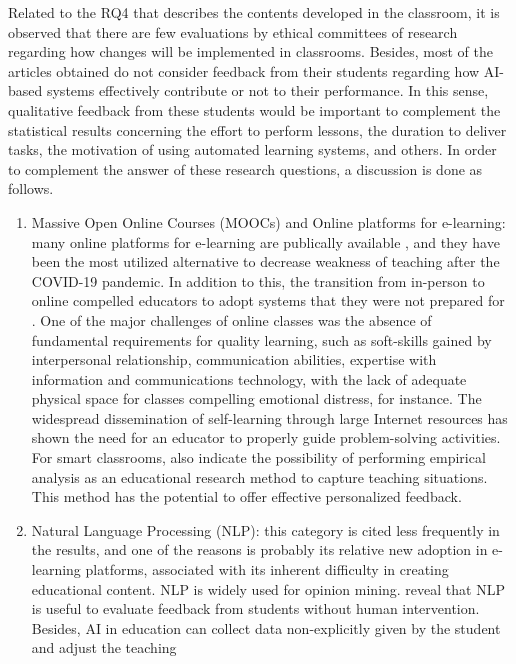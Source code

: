 \documentclass[english]{textolivre}
\begin{document}
Related to the RQ4 that describes the contents developed in the
classroom, it is observed that there are few evaluations by ethical
committees of research regarding how changes will be implemented in
classrooms. Besides, most of the articles obtained do not consider
feedback from their students regarding how AI-based systems effectively
contribute or not to their performance. In this sense, qualitative
feedback from these students would be important to complement the
statistical results concerning the effort to perform lessons, the
duration to deliver tasks, the motivation of using automated learning
systems, and others. In order to complement the answer of these research
questions, a discussion is done as follows.

\begin{enumerate}
    \item Massive Open Online Courses (MOOCs) and Online platforms for
  e-learning: many online platforms for e-learning are publically
  available \cite{Zhang2022,Shaik2022,Wu2021,Bhatnagar2023,Syzdykbayeva2021}, and they have been the most utilized alternative to decrease
  weakness of teaching after the COVID-19 pandemic. In addition to this,
  the transition from in-person to online compelled educators to adopt
  systems that they were not prepared for \cite{Pokhrel2021}. One of
  the major challenges of online classes was the absence of fundamental
  requirements for quality learning, such as soft-skills gained by
  interpersonal relationship, communication abilities, expertise with
  information and communications technology, with the lack of adequate
  physical space for classes compelling emotional distress, for
  instance. The widespread dissemination of self-learning through large
  Internet resources has shown the need for an educator to properly
  guide problem-solving activities. For smart classrooms, \textcite{Zhang2022} also indicate the possibility of performing empirical
  analysis as an educational research method to capture teaching
  situations. This method has the potential to offer effective
  personalized feedback.
  \item Natural
Language Processing (NLP): this category is cited less frequently in the
results, and one of the reasons is probably its relative new adoption in
e-learning platforms, associated with its inherent difficulty in
creating educational content. NLP is widely used for opinion mining.
\textcite{Shaik2022} reveal that NLP is useful to evaluate feedback from
students without human intervention. Besides, AI in education can
collect data non-explicitly given by the student and adjust the teaching

\end{enumerate}
\end{document}
